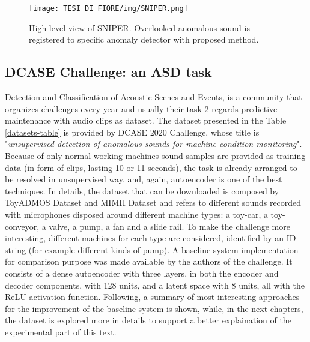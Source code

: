 \begin{figure}[ht]
\texttt{[image: TESI DI FIORE/img/SNIPER.png]}
\centering
\caption{High level view of SNIPER. Overlooked anomalous sound is registered to specific anomaly detector with proposed method. \cite{25SNIPER}}
\label{SNIPER}
\end{figure}
\subsection{DCASE Challenge: an ASD task}
Detection and Classification of Acoustic Scenes and Events, is a community that organizes challenges every year and usually their task 2 regards predictive maintenance with audio clips as dataset. The dataset presented in the Table \ref{datasets-table} is provided by DCASE 2020 Challenge, whose title is "\textit{unsupervised detection of anomalous sounds for machine condition monitoring}". Because of only normal working machines sound samples are provided as training data (in form of clips, lasting 10 or 11 seconds), the task is already arranged to be resolved in unsupervised way, and, again, autoencoder is one of the best techniques. In details, the dataset that can be downloaded is composed by ToyADMOS Dataset and MIMII Dataset \cite{DCASE} and refers to different sounds recorded with microphones disposed around different machine types: a toy-car, a toy-conveyor, a valve, a pump, a fan and a slide rail. To make the challenge more interesting, different machines for each type are considered, identified by an ID string (for example different kinds of pump). A baseline system implementation for comparison purpose was made available by the authors of the challenge. It consists of a dense autoencoder with three layers, in both the encoder and decoder components, with 128 units, and a latent space with 8 units, all with the ReLU activation function. Following, a summary of most interesting approaches for the improvement of the baseline system is shown, while, in the next chapters, the dataset is explored more in details to support a better explaination of the experimental part of this text.\\
